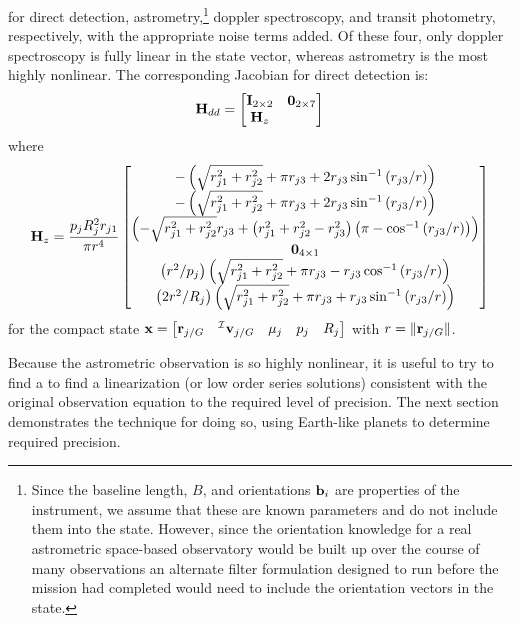 for direct detection, astrometry,\footnote{Since the baseline length, $B$, and orientations $\mathbf b_i$ are properties of the instrument, we assume that these are known parameters and do not include them into the state.  However, since the orientation knowledge for a real astrometric space-based observatory would be built up over the course of many observations \citep{murphy2004} an alternate filter formulation designed to run before the mission had completed would need to include the orientation vectors in the state.} doppler spectroscopy, and transit photometry, respectively, with the appropriate noise terms added. Of these four, only doppler spectroscopy is fully linear in the state vector, whereas astrometry is the most highly nonlinear.  The corresponding Jacobian for direct detection is:
\begin{equation}
\mathbf H_{dd} = \begin{bmatrix}
\mathbf I_{2 \times 2} & \mathbf 0_{2 \times 7}\\
\mathbf H_z
\end{bmatrix}
\end{equation}
where
\begin{equation}
\mathbf H_z = 
\frac{p_jR_j^2 r_{j1}}{\pi r^4}\begin{bmatrix}
-\left(\sqrt{ r_{j1}^2 +  r_{j2}^2} + \pi  r_{j3} + 2  r_{j3}\sin^{-1}\left(r_{j3}/r\right) \right)\\
-\left(\sqrt{ r_{j1}^2 +  r_{j2}^2} + \pi  r_{j3} + 2  r_{j3}\sin^{-1}\left(r_{j3}/r\right) \right) \\
\left(-\sqrt{ r_{j1}^2 +  r_{j2}^2} r_{j3} + \left( r_{j1}^2 +  r_{j2}^2 -  r_{j3}^2\right)\left(\pi - \cos^{-1}\left(r_{j3}/r\right) \right)\right) \\
\mathbf 0_{4 \times 1} \\
\left(r^2/p_j\right)\left(\sqrt{ r_{j1}^2 +  r_{j2}^2}  + \pi r_{j3} - r_{j3}  \cos^{-1}\left(r_{j3}/r\right)\right) \\
\left(2r^2/R_j\right)\left(\sqrt{ r_{j1}^2 +  r_{j2}^2}  + \pi r_{j3} + r_{j3}  \sin^{-1}\left(r_{j3}/r\right)\right)
\end{bmatrix}
\end{equation}
for the compact state $\mathbf x = \begin{bmatrix} \mathbf r_{j/G}&  {}^\mathcal I \mathbf v_{j/G}& \mu_j& p_j& R_j \end{bmatrix}$ with $r = \Vert \mathbf r_{j/G} \Vert$.

Because the astrometric observation is so highly nonlinear, it is useful to try to find a to find a linearization (or low order series solutions) consistent with the original observation equation to the required level of precision.  The next section demonstrates the technique for doing so, using Earth-like planets to determine required precision.

